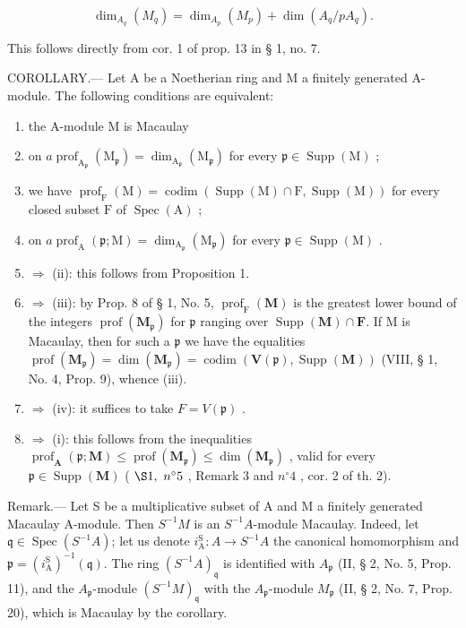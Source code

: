 \[
\dim_ {A _ {q}} (M _ {q}) = \dim_ {A _ {p}} (M _ {p}) + \dim (A _ {q} / p A _ {q}).
\]

This follows directly from cor. 1 of prop. 13 in § 1, no. 7.

COROLLARY.--- Let A be a Noetherian ring and M a finitely generated A-module. The following conditions are equivalent:

\begin{enumerate}
\def\labelenumi{(\roman{enumi})}
\item
  the A-module M is Macaulay
\item
  on \(a \operatorname{prof}_{\mathrm{A}_{\mathfrak{p}}}(\mathrm{M}_{\mathfrak{p}}) = \dim_{\mathrm{A}_{\mathfrak{p}}}(\mathrm{M}_{\mathfrak{p}})\) for every \(\mathfrak{p} \in \operatorname{Supp}(\mathrm{M})\) ;
\item
  we have \(\operatorname{prof}_{\mathrm{F}}(\mathrm{M}) = \operatorname{codim}(\operatorname{Supp}(\mathrm{M}) \cap \mathrm{F}, \operatorname{Supp}(\mathrm{M}))\) for every closed subset \(\mathrm{F}\) of \(\operatorname{Spec}(\mathrm{A})\) ;
\item
  on \(a \operatorname{prof}_{\mathrm{A}}(\mathfrak{p}; \mathrm{M}) = \dim_{\mathrm{A}_{\mathfrak{p}}}(\mathrm{M}_{\mathfrak{p}})\) for every \(\mathfrak{p} \in \operatorname{Supp}(\mathrm{M})\) .
\item
  \(\Rightarrow\) (ii): this follows from Proposition 1.
\item
  \(\Rightarrow\) (iii): by Prop. 8 of § 1, No. 5, \(\operatorname{prof}_{\mathrm{F}}(\mathbf{M})\) is the greatest lower bound of the integers \(\operatorname{prof}(\mathbf{M}_{\mathfrak{p}})\) for \(\mathfrak{p}\) ranging over \(\operatorname{Supp}(\mathbf{M}) \cap \mathbf{F}\). If M is Macaulay, then for such a \(\mathfrak{p}\) we have the equalities \(\operatorname{prof}(\mathbf{M}_{\mathfrak{p}}) = \dim(\mathbf{M}_{\mathfrak{p}}) = \operatorname{codim}(\mathbf{V}(\mathfrak{p}), \operatorname{Supp}(\mathbf{M}))\) (VIII, § 1, No. 4, Prop. 9), whence (iii).
\item
  \(\Rightarrow\) (iv): it suffices to take \(F = V(\mathfrak{p})\) .
\item
  \(\Rightarrow\) (i): this follows from the inequalities \(\operatorname{prof}_{\mathbf{A}}(\mathfrak{p};\mathbf{M})\leqslant\operatorname{prof}(\mathbf{M}_{\mathfrak{p}})\leqslant\dim(\mathbf{M}_{\mathfrak{p}})\) , valid for every \(\mathfrak{p}\in\operatorname{Supp}(\mathbf{M})\) ( \(\S 1,\ n^{\circ}5\) , Remark 3 and \(n^{\circ}4\) , cor. 2 of th. 2).
\end{enumerate}

Remark.--- Let S be a multiplicative subset of A and M a finitely generated Macaulay A-module. Then \(S^{-1}M\) is an \(S^{-1}A\)-module Macaulay. Indeed, let \(\mathfrak{q} \in \operatorname{Spec}(S^{-1}A)\); let us denote \(i_{\mathrm{A}}^{\mathrm{S}} : A \to S^{-1}A\) the canonical homomorphism and \(\mathfrak{p} = (i_{\mathrm{A}}^{\mathrm{S}})^{-1}(\mathfrak{q})\). The ring \((S^{-1}A)_{\mathfrak{q}}\) is identified with \(A_{\mathfrak{p}}\) (II, § 2, No. 5, Prop. 11), and the \(A_{\mathfrak{p}}\)-module \((S^{-1}M)_{\mathfrak{q}}\) with the \(A_{\mathfrak{p}}\)-module \(M_{\mathfrak{p}}\) (II, § 2, No. 7, Prop. 20), which is Macaulay by the corollary.

